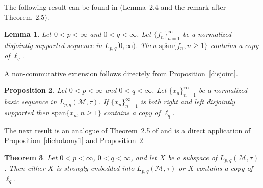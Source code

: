\documentclass[12pt]{amsart}
\let\cal\mathcal
\newtheorem{theorem}{Theorem}
\newtheorem{lemma}[theorem]{Lemma}
\newtheorem{proposition}[theorem]{Proposition}
\def\m{{\cal M}}
\numberwithin{equation}{section}
\numberwithin{theorem}{section}
\begin{document}
The following result can be found in \cite{CADI}(Lemma~2.4 and the 
remark after Theorem~2.5).

\begin{lemma}
Let $0<p<\infty$ and $0< q<\infty$. Let $\{f_n\}_{n=1}^\infty$ be a 
normalized
disjointly supported sequence in $L_{p,q}[0,\infty)$.
Then $\overline{\text{span}}\{f_n, n\geq 1\}$ contains a copy
of $\ell_q$.
\end{lemma}

A non-commutative extension follows directely from 
Proposition~\ref{disjoint}.

\begin{proposition}\label{lq}
Let $0<p<\infty$ and $0<q<\infty$. 
Let $\{x_n\}_{n=1}^\infty$ be a normalized basic 
 sequence in $L_{p,q}(\m,\tau)$. If $\{x_n\}_{n=1}^\infty$ is both 
right and left disjointly supported then 
 $\overline{\text{span}}\{x_n, n\geq 1\}$ contains a copy
of $\ell_q$.
\end{proposition}

The next result is an analogue of Theorem~2.5 of \cite{CADI}
and is a direct application of Proposition~\ref{dichotomy1} and 
Proposition~\ref{lq}

\begin{theorem}\label{dichotomy3}
Let  $0<p<\infty$, $0< q<\infty$, and let $X$ be a subspace
of $L_{p,q}(\m,\tau)$. Then either $X$ is strongly embedded 
into $L_{p,q}(\m,\tau)$  or $X$ contains a copy of $\ell_q$.
\end{theorem}

\smallskip
\end{document}
